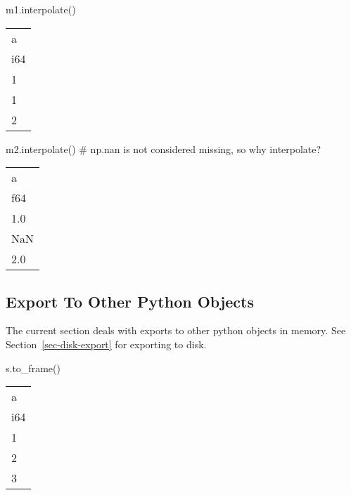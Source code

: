 \documentclass[
  letterpaper,
  DIV=11,
  numbers=noendperiod]{scrartcl}
\newenvironment{Shaded}{\begin{snugshade}}{\end{snugshade}}
\newcommand{\CommentTok}[1]{\textcolor[rgb]{0.37,0.37,0.37}{#1}}
\newcommand{\NormalTok}[1]{\textcolor[rgb]{0.00,0.23,0.31}{#1}}
\begin{document}
\begin{Shaded}
\begin{Highlighting}[]
\NormalTok{m1.interpolate()}
\end{Highlighting}
\end{Shaded}

\begin{longtable}[]{@{}l@{}}
\toprule()
a \\
i64 \\
\midrule()
\endhead
1 \\
1 \\
2 \\
\bottomrule()
\end{longtable}

\begin{Shaded}
\begin{Highlighting}[]
\NormalTok{m2.interpolate() }\CommentTok{\# np.nan is not considered missing, so why interpolate?}
\end{Highlighting}
\end{Shaded}

\begin{longtable}[]{@{}l@{}}
\toprule()
a \\
f64 \\
\midrule()
\endhead
1.0 \\
NaN \\
2.0 \\
\bottomrule()
\end{longtable}

\hypertarget{export-to-other-python-objects}{%
\subsection{Export To Other Python
Objects}\label{export-to-other-python-objects}}

The current section deals with exports to other python objects in
memory. See Section~\ref{sec-disk-export} for exporting to disk.

\begin{Shaded}
\begin{Highlighting}[]
\NormalTok{s.to\_frame() }
\end{Highlighting}
\end{Shaded}

\begin{longtable}[]{@{}l@{}}
\toprule()
a \\
i64 \\
\midrule()
\endhead
1 \\
2 \\
3 \\
\bottomrule()
\end{longtable}
\end{document}
